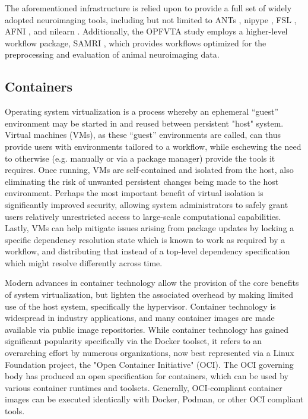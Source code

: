 The aforementioned infrastructure is relied upon to provide a full set of widely adopted neuroimaging tools, including but not limited to ANTs \cite{ants}, nipype \cite{nipype}, FSL \cite{fsl}, AFNI \cite{afni}, and nilearn \cite{nilearn}.
Additionally, the OPFVTA study employs a higher-level workflow package, SAMRI \cite{samri,irsabi}, which provides workflows optimized for the preprocessing and evaluation of animal neuroimaging data.


\subsection{Containers}

Operating system virtualization is a process whereby an ephemeral “guest” environment may be started in and reused between persistent "host" system.
Virtual machines (VMs), as these “guest” environments are called, can thus provide users with environments tailored to a workflow, while eschewing the need to otherwise (e.g. manually or via a package manager) provide the tools it requires.
Once running, VMs are self-contained and isolated from the host, also eliminating the risk of unwanted persistent changes being made to the host environment.
Perhaps the most important benefit of virtual isolation is significantly improved security, allowing system administrators to safely grant users relatively unrestricted access to large-scale computational capabilities.
Lastly, VMs can help mitigate issues arising from package updates by locking a specific dependency resolution state which is known to work as required by a workflow, and distributing that instead of a top-level dependency specification which might resolve differently across time.

Modern advances in container technology allow the provision of the core benefits of system virtualization, but lighten the associated overhead by making limited use of the host system, specifically the hypervisor.
Container technology is widespread in industry applications, and many container images are made available via public image repositories.
While container technology has gained significant popularity specifically via the Docker toolset, it refers to an overarching effort by numerous organizations, now best represented via a Linux Foundation project, the "Open Container Initiative" (OCI).
The OCI governing body has produced an open specification for containers, which can be used by various container runtimes and toolsets.
Generally, OCI-compliant container images can be executed identically with Docker, Podman, or other OCI compliant tools.

